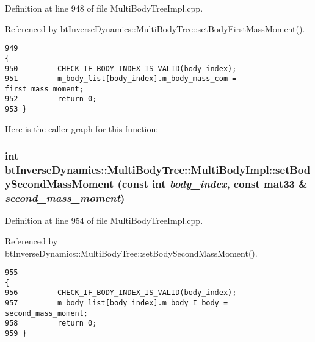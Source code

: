  

Definition at line 948 of file MultiBodyTreeImpl.cpp.

Referenced by btInverseDynamics::MultiBodyTree::setBodyFirstMassMoment().

\begin{Code}\begin{verbatim}949                                                                                                                                                 {
950         CHECK_IF_BODY_INDEX_IS_VALID(body_index);
951         m_body_list[body_index].m_body_mass_com = first_mass_moment;
952         return 0;
953 }
\end{verbatim}
\end{Code}




Here is the caller graph for this function:\hypertarget{classbt_inverse_dynamics_1_1_multi_body_tree_1_1_multi_body_impl_dc1e2a8408ad2e37469f47280d19536f}{
\subsubsection[setBodySecondMassMoment]{\setlength{\rightskip}{0pt plus 5cm}int btInverseDynamics::MultiBodyTree::MultiBodyImpl::setBodySecondMassMoment (const int {\em body\_\-index}, \/  const mat33 \& {\em second\_\-mass\_\-moment})}}
\label{classbt_inverse_dynamics_1_1_multi_body_tree_1_1_multi_body_impl_dc1e2a8408ad2e37469f47280d19536f}


 

Definition at line 954 of file MultiBodyTreeImpl.cpp.

Referenced by btInverseDynamics::MultiBodyTree::setBodySecondMassMoment().

\begin{Code}\begin{verbatim}955                                                                                                                                                    {
956         CHECK_IF_BODY_INDEX_IS_VALID(body_index);
957         m_body_list[body_index].m_body_I_body = second_mass_moment;
958         return 0;
959 }
\end{verbatim}
\end{Code}




